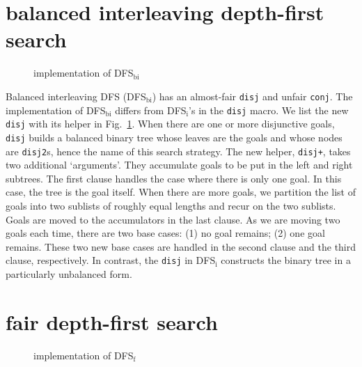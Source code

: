 \documentclass[format=acmlarge, review=true, authordraft=true]{acmart}
\newcommand{\conj}{\texttt{conj}}
\newcommand{\disj}{\texttt{disj}}
\newcommand{\DFSi }[0]{DFS$_\textrm{i}$}
\newcommand{\DFSf }[0]{DFS$_\textrm{f}$}
\newcommand{\DFSbi}[0]{DFS$_\textrm{bi}$}
\begin{document}
\section{balanced interleaving depth-first search}

\begin{figure}
	
	\caption{implementation of \DFSbi{}}
	\label{balanced-disj}
\end{figure}

Balanced interleaving DFS (DFS$_\textrm{bi}$) has an almost-fair \disj{} and unfair 
\conj{}. The implementation of DFS$_\textrm{bi}$ differs from 
DFS$_\textrm{i}$'s in the \disj{} macro. We list the new \disj{} with its 
helper in Fig.~\ref{balanced-disj}. When there are one or more disjunctive 
goals, \disj{} builds a balanced binary tree whose leaves are the goals and 
whose nodes are \texttt{disj2}s, hence the name of this search strategy. 
The new helper, \texttt{disj+}, takes two additional `arguments'. They 
accumulate goals to be put in the left and right subtrees. The first clause 
handles the case where there is only one goal. In this case, the tree is the 
goal itself. When there are more goals, we partition the list of goals 
into two sublists of roughly equal lengths and recur on the two sublists. Goals 
are moved to the accumulators in the last clause. As we are moving 
two goals each time, there are two base cases: (1) no goal remains; (2) one 
goal remains. These two new base cases are handled in the second clause and the 
third clause, respectively. In contrast, the \disj{} in \DFSi{} constructs the 
binary tree in a particularly unbalanced form.

\section{fair depth-first search}


\begin{figure}
	
	\caption{implementation of \DFSf{}}
	\label{fDFS}
\end{figure}
\end{document}
